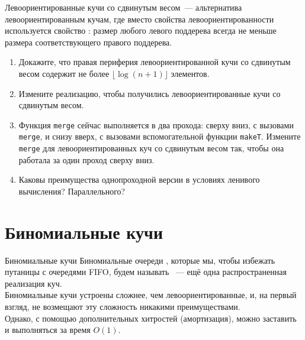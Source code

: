 \begin{frame}[fragile]{}
\begin{exercise}\label{ex:3.4}
  Левоориентированные кучи
  со сдвинутым весом~--- альтернатива левоориентированным кучам, где
  вместо свойства левоориентированности используется свойство
  : размер любого левого поддерева всегда не меньше размера
  соответствующего правого поддерева.
  \begin{enumerate}
    \item Докажите, что правая периферия левоориентированной кучи со
    сдвинутым весом содержит не более $\lfloor \log(n+1) \rfloor$ элементов.
    \item Измените реализацию, чтобы получились
    левоориентированные кучи со сдвинутым весом.
    \item Функция \lstinline!merge! сейчас выполняется в два прохода:
    сверху вниз, с вызовами \lstinline!merge!, и снизу вверх, с
    вызовами вспомогательной функции \lstinline!makeT!. Измените
    \lstinline!merge! для левоориентированных куч со сдвинутым весом
    так, чтобы она работала за один проход сверху вниз.
    \item Каковы преимущества однопроходной версии в
    условиях ленивого вычисления? Параллельного?
  \end{enumerate}
\end{exercise}

\end{frame}

\section{Биномиальные кучи}
\label{sc:3.2}

\begin{frame}{Биномиальные кучи}
Биномиальные очереди \cite{Vuillemin1978, Brown1978}, которые мы,
чтобы избежать путаницы с очередями FIFO, будем называть ~--- ещё одна распространенная реализация
куч. \\

Биномиальные кучи устроены сложнее, чем левоориентированные, и, на
первый взгляд, не возмещают эту сложность никакими
преимуществами. \\

Однако, с помощью дополнительных хитростей (амортизация\cite{sc:5.3}), можно заставить  и
 выполняться за время $O(1)$.



\end{frame}

